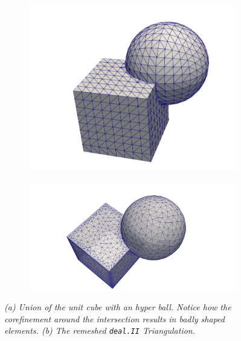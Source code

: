 \documentclass{ansarticle-preprint}
\newcommand{\specialword}[1]{\texttt{#1}}
\newcommand{\dealii}{{\specialword{deal.II}}\xspace}
\begin{document}
  \begin{figure}
    \centering
    \begin{subfigure}[b]{0.4\textwidth}
      \centering
      \includegraphics[height=.2\paperheight]{png/intersection_cube_sphere_mesh.png}
      \caption{\label{fig:corefinement}}
    \end{subfigure}
    \qquad
    \begin{subfigure}[b]{0.5\textwidth}
      \centering
      \includegraphics[height=.2\paperheight]{png/cube_sphere_remeshed.png}
      \caption{ \label{fig:corefinement_remeshed}}
    \end{subfigure}
    \caption{\it (a) Union of the unit cube with an hyper ball. Notice
      how the corefinement around the intersection results in badly shaped elements. (b) The remeshed \dealii{} Triangulation.}
  \end{figure}
  
\end{document}
